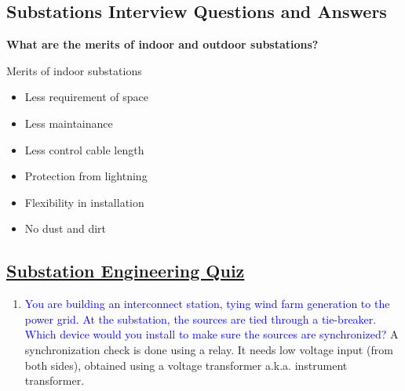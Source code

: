 \subsection{Substations Interview Questions and Answers}

\textbf{What are the merits of indoor and outdoor substations?}

Merits of indoor substations
\begin{itemize}
    \item Less requirement of space
    \item Less maintainance 
    \item Less control cable length
    \item Protection from lightning
    \item Flexibility in installation
    \item No dust and dirt
\end{itemize}

\subsection{\href{https://peguru.com/quiz-substation-engineering/}{Substation Engineering Quiz}}
    \begin{enumerate}
        \item \textcolor{blue}{You are building an interconnect station, tying wind farm generation to the power grid. At the substation, the sources are tied through a tie-breaker. Which device would you install to make sure the sources are synchronized?} A synchronization check is done using a relay. It needs low voltage input (from both sides), obtained using a voltage transformer a.k.a. instrument transformer.
    \end{enumerate}